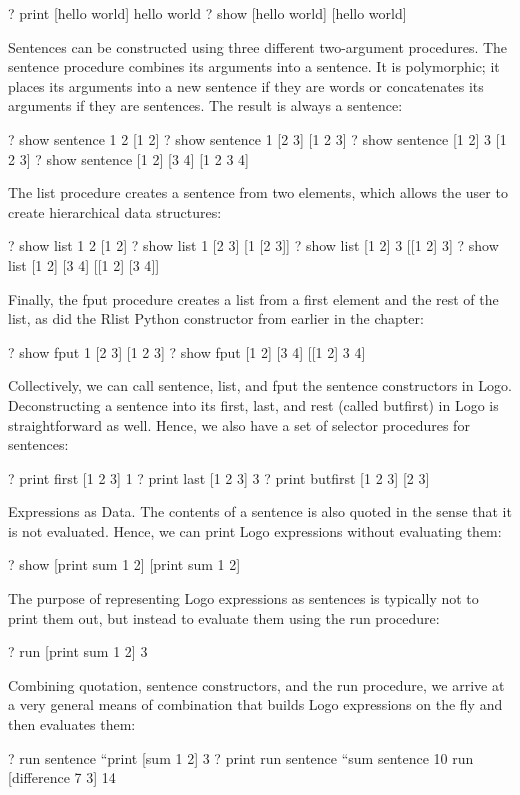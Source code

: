 \documentclass[letterpaper,10pt,dvipdfmx]{sphinxmanual}
\begin{document}
? print {[}hello world{]}
hello world
? show {[}hello world{]}
{[}hello world{]}

Sentences can be constructed using three different two-argument procedures. The sentence procedure combines its arguments into a sentence. It is polymorphic; it places its arguments into a new sentence if they are words or concatenates its arguments if they are sentences. The result is always a sentence:

? show sentence 1 2
{[}1 2{]}
? show sentence 1 {[}2 3{]}
{[}1 2 3{]}
? show sentence {[}1 2{]} 3
{[}1 2 3{]}
? show sentence {[}1 2{]} {[}3 4{]}
{[}1 2 3 4{]}

The list procedure creates a sentence from two elements, which allows the user to create hierarchical data structures:

? show list 1 2
{[}1 2{]}
? show list 1 {[}2 3{]}
{[}1 {[}2 3{]}{]}
? show list {[}1 2{]} 3
{[}{[}1 2{]} 3{]}
? show list {[}1 2{]} {[}3 4{]}
{[}{[}1 2{]} {[}3 4{]}{]}

Finally, the fput procedure creates a list from a first element and the rest of the list, as did the Rlist Python constructor from earlier in the chapter:

? show fput 1 {[}2 3{]}
{[}1 2 3{]}
? show fput {[}1 2{]} {[}3 4{]}
{[}{[}1 2{]} 3 4{]}

Collectively, we can call sentence, list, and fput the sentence constructors in Logo. Deconstructing a sentence into its first, last, and rest (called butfirst) in Logo is straightforward as well. Hence, we also have a set of selector procedures for sentences:

? print first {[}1 2 3{]}
1
? print last {[}1 2 3{]}
3
? print butfirst {[}1 2 3{]}
{[}2 3{]}

Expressions as Data. The contents of a sentence is also quoted in the sense that it is not evaluated. Hence, we can print Logo expressions without evaluating them:

? show {[}print sum 1 2{]}
{[}print sum 1 2{]}

The purpose of representing Logo expressions as sentences is typically not to print them out, but instead to evaluate them using the run procedure:

? run {[}print sum 1 2{]}
3

Combining quotation, sentence constructors, and the run procedure, we arrive at a very general means of combination that builds Logo expressions on the fly and then evaluates them:

? run sentence ``print {[}sum 1 2{]}
3
? print run sentence ``sum sentence 10 run {[}difference 7 3{]}
14
\end{document}
